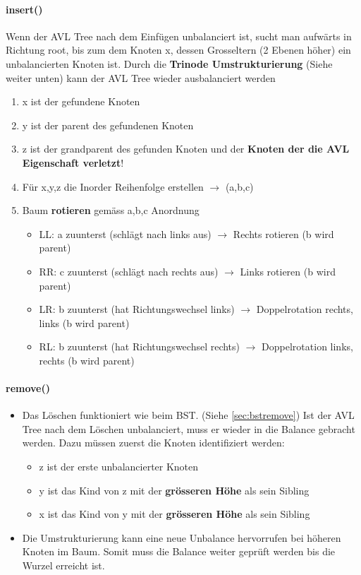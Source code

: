 \paragraph{insert()}
Wenn der AVL Tree nach dem Einfügen unbalanciert ist, sucht man aufwärts in Richtung root, bis zum dem Knoten x, dessen Grosseltern (2 Ebenen höher) ein unbalancierten Knoten ist. Durch die \textbf{Trinode Umstrukturierung} (Siehe weiter unten) kann der AVL Tree wieder ausbalanciert werden
\begin{enumerate}
	\item x ist der gefundene Knoten
	\item y ist der parent des gefundenen Knoten
	\item z ist der grandparent des gefunden Knoten und der \textbf{Knoten der die AVL Eigenschaft verletzt}!
	\item Für x,y,z die Inorder Reihenfolge erstellen $\rightarrow$ (a,b,c)
	\item Baum \textbf{rotieren} gemäss a,b,c Anordnung
	\begin{itemize}
		\item LL: a zuunterst (schlägt nach links aus) $\rightarrow$ Rechts rotieren (b wird parent)
		\item RR: c zuunterst (schlägt nach rechts aus) $\rightarrow$ Links rotieren (b wird parent)
		\item LR: b zuunterst (hat Richtungswechsel links) $\rightarrow$ Doppelrotation rechts, links (b wird parent)
		\item RL: b zuunterst (hat Richtungswechsel rechts) $\rightarrow$ Doppelrotation links, rechts (b wird parent)
	\end{itemize}
\end{enumerate}
\paragraph{remove()} 
\begin{itemize}
	\item Das Löschen funktioniert wie beim BST. (Siehe \ref{sec:bstremove}) Ist der AVL Tree nach dem Löschen unbalanciert, muss er wieder in die Balance gebracht werden. Dazu müssen zuerst die Knoten identifiziert werden:
	\begin{itemize}
		\item z ist der erste unbalancierter Knoten
		\item y ist das Kind von z mit der \textbf{grösseren Höhe} als sein Sibling
		\item x ist das Kind von y mit der \textbf{grösseren Höhe} als sein Sibling
	\end{itemize} 
	\item Die Umstrukturierung kann eine neue Unbalance hervorrufen bei höheren Knoten im Baum. Somit muss die Balance weiter geprüft werden bis die Wurzel erreicht ist.
\end{itemize}

